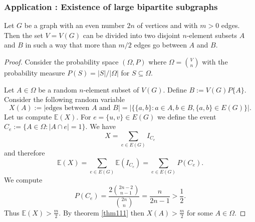 \subsubsection{Application : Existence of large bipartite subgraphs}
\begin{theorem}
Let $G$ be a graph with an even number $2n$ of vertices and with $m>0$ edges. Then the set $V=V(G)$ can be divided into two disjoint $n$-element subsets $A$ and $B$ in such a way that more than $m/2$ edges go between $A$ and $B$.
\end{theorem}
\begin{proof}
Consider the probability space $(\Omega,P)$ where $\Omega=\binom{ V}  {n }$ with the probability measure $P(S)=|S|/|\Omega|$ for $S\subseteq \Omega$. 

Let $A\in \Omega$ be a random $n$-element subset of $V(G)$. Define $B:=V(G)P\{ A \}$. Consider the following random variable
$$
X(A):= |\text{edges between }A\text{ and }B |=|\{ \{ a,b \}:a\in A,b\in B,\{ a,b \}\in E(G) \}|.
$$
Let us compute $\mathbb{E}(X)$. For $e=\{ u,v \}\in E(G)$ we define the event $C_{e}:=\{ A\in \Omega:|A\cap e|=1 \}$. We have 
$$
X=\sum _{e\in E(G)}I_{C_{e}}
$$
and therefore
$$
\mathbb{E}(X)=\sum _{e\in E(G)}\mathbb{E}(I_{C_{e}})=\sum _{e\in E(G)}P(C_{e}).
$$
We compute
$$
P(C_{e})=\frac{2\binom{ 2n-2}  {n-1}}{\binom{ 2n}  {n } }=\frac{n}{2n-1}> \frac{1}{2}.
$$
Thus $\mathbb{E}(X)> \frac{m}{2}$. By theorem \ref{thm111} then $X(A)> \frac{m}{2}$ for some $A\in \Omega$.
\end{proof}
